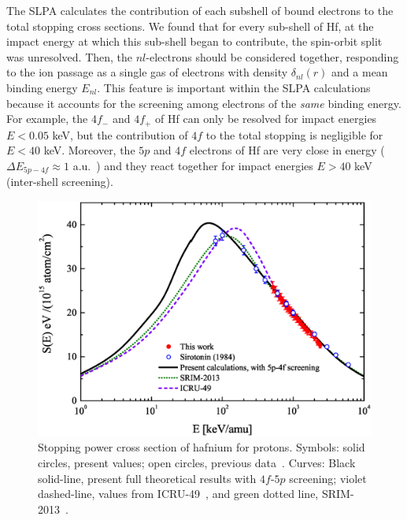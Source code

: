 \documentclass[aps,pra,reprint,groupedaddress]{revtex4-1}
\begin{document}
The SLPA calculates the contribution of each subshell of bound electrons to the total stopping cross sections. We found that for every sub-shell of Hf, at the impact energy at which this sub-shell began to contribute, the spin-orbit split was unresolved.  Then, the $nl$-electrons should be considered together, responding to the ion passage as a single gas of electrons with density $\delta_{nl}(r)$ and a mean binding energy $E_{nl}$. This feature is important within the SLPA calculations because it accounts for the screening among electrons of the \textit{same} binding energy. For example, the $4f_{-}$ and $4f_{+}$ of Hf can only be resolved for impact energies $E<0.05$ keV, but the contribution of $4f$ to the total stopping is negligible for $E<40$ keV. Moreover, the $5p$ and $4f$ electrons of Hf are very close in energy ($\Delta E_{5p-4f} \approx 1$ a.u.~\cite{mendez2019}) and they react together for impact energies $E>40$ keV (inter-shell screening).

\begin{figure}[!t]
\centering
\includegraphics[width=13.0cm]{Fig03.eps}
\caption{Stopping power cross section of hafnium for protons. Symbols: solid circles, present values; open circles, previous data~\cite{Sirotinin}. Curves: Black solid-line, present full theoretical results with $4f$-$5p$ screening; violet dashed-line, values from ICRU-49~\cite{ICRU49}, and green dotted line, SRIM-2013~\cite{Ziegler01}.}
\label{F03}
\end{figure}
\end{document}
